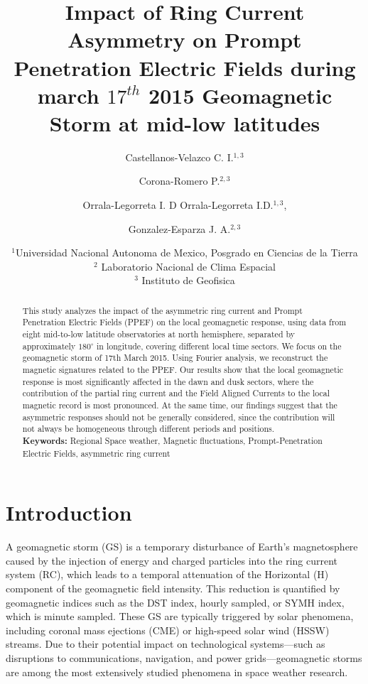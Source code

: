 \documentclass[a4paper]{article}
\title{Impact of Ring Current Asymmetry on Prompt Penetration Electric Fields during march $17^{th}$ 2015 Geomagnetic Storm at mid-low latitudes\\}
\author{Castellanos-Velazco C. I.$^{1,3}$ \and Corona-Romero P.$^{2,3}$ \and Orrala-Legorreta I. D Orrala-Legorreta I.D.$^{1,3}$, \and Gonzalez-Esparza J. A.$^{2,3}$}
\date{
	$^1$Universidad Nacional Autonoma de Mexico, Posgrado en Ciencias de la Tierra \\ %
	$^2$ Laboratorio Nacional de Clima Espacial \\
	$^3$ Instituto de Geofisica
}
\theoremstyle{plain}
\theoremstyle{definition}
\begin{document}
	\maketitle
	
	\begin{abstract}
		
This study analyzes the impact of the asymmetric ring current and Prompt Penetration Electric Fields (PPEF) on the local geomagnetic response, using data from eight mid-to-low latitude observatories at north hemisphere, separated by approximately $180^\circ$ in longitude, covering different local time sectors. We focus on the geomagnetic storm of 17th March 2015. Using Fourier analysis, we reconstruct the magnetic signatures related to the PPEF. Our results show that the local geomagnetic response is most significantly affected in the dawn and dusk sectors, where the contribution of the partial ring current and the Field Aligned Currents to the local magnetic record is most pronounced. At the same time, our findings suggest that the asymmetric responses should not be generally considered, since the contribution will not always be homogeneous through different periods and positions. 
		\\
		
		\noindent\textbf{Keywords:} Regional Space weather, Magnetic fluctuations, Prompt-Penetration Electric Fields, asymmetric ring current
	\end{abstract}
	
	
	\section{Introduction}
	\label{sec:intro}
	
	
	A geomagnetic storm (GS) is a temporary disturbance of Earth's magnetosphere caused by the injection of energy and charged particles into the ring current system (RC), which leads to a temporal attenuation of the Horizontal (H) component of the geomagnetic field intensity. This reduction is quantified by geomagnetic indices such as the DST index, hourly sampled, or SYMH index, which is minute sampled. These GS are typically triggered by solar phenomena, including coronal mass ejections (CME) or high-speed solar wind (HSSW) streams. Due to their potential impact on technological systems—such as disruptions to communications, navigation, and power grids—geomagnetic storms are among the most extensively studied phenomena in space weather research.\\
	
\end{document}
